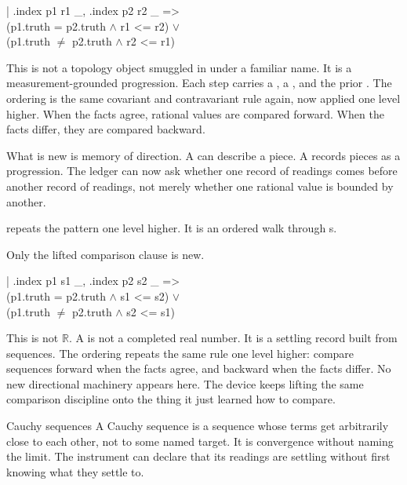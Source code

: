 \begin{leancode}
\quad | .index p1 r1 \_, .index p2 r2 \_ =>\\
\quad\quad (p1.truth = p2.truth \(\wedge\) r1 <= r2) \(\vee\)\\
\quad\quad (p1.truth \(\neq\) p2.truth \(\wedge\) r2 <= r1)
\end{leancode}

This is not a topology object smuggled in under a familiar name. It is a
measurement-grounded progression. Each step carries a , a
, and the prior . The ordering is the same
covariant and contravariant rule again, now applied one level higher. When the
facts agree, rational values are compared forward. When the facts differ, they
are compared backward.

What is new is memory of direction. A  can describe a piece. A
 records pieces as a progression. The ledger can now ask whether
one record of readings comes before another record of readings, not merely
whether one rational value is bounded by another.

 repeats the pattern one level higher. It is an ordered walk
through s.

Only the lifted comparison clause is new.

\begin{leancode}
\quad | .index p1 s1 \_, .index p2 s2 \_ =>\\
\quad\quad (p1.truth = p2.truth \(\wedge\) s1 <= s2) \(\vee\)\\
\quad\quad (p1.truth \(\neq\) p2.truth \(\wedge\) s2 <= s1)
\end{leancode}

This is not \(\mathbb{R}\). A  is not a completed real number. It
is a settling record built from sequences. The ordering repeats the same rule
one level higher: compare sequences forward when the facts agree, and backward
when the facts differ. No new directional machinery appears here. The device
keeps lifting the same comparison discipline onto the thing it just learned how
to compare.

\begin{sidebar}{Cauchy sequences}
\label{sb:cauchy-sequences}
A Cauchy sequence is a sequence whose terms get arbitrarily close to each
other, not to some named target. It is convergence without naming the limit.
The instrument can declare that its readings are settling without first knowing
what they settle to.
\end{sidebar}

